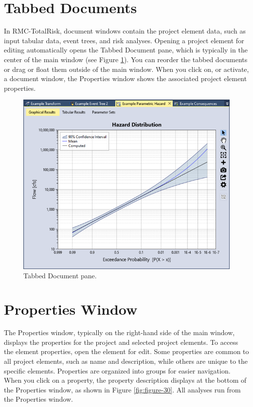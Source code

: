 \documentclass[
]{book}
\begin{document}
\hypertarget{tabbed-documents}{%
\section{Tabbed Documents}\label{tabbed-documents}}

In RMC-TotalRisk, document windows contain the project element data, such as input tabular data, event trees, and risk analyses. Opening a project element for editing automatically opens the Tabbed Document pane, which is typically in the center of the main window (see Figure \ref{fig:figure-29}). You can reorder the tabbed documents or drag or float them outside of the main window. When you click on, or activate, a document window, the Properties window shows the associated project element properties.

\begin{figure}

{\centering \includegraphics{images/figure29} 

}

\caption{Tabbed Document pane.}\label{fig:figure-29}
\end{figure}

\hypertarget{properties-window}{%
\section{Properties Window}\label{properties-window}}

The Properties window, typically on the right-hand side of the main window, displays the properties for the project and selected project elements. To access the element properties, open the element for edit. Some properties are common to all project elements, such as name and description, while others are unique to the specific elements. Properties are organized into groups for easier navigation. When you click on a property, the property description displays at the bottom of the Properties window, as shown in Figure \ref{fig:figure-30}. All analyses run from the Properties window.
\end{document}
